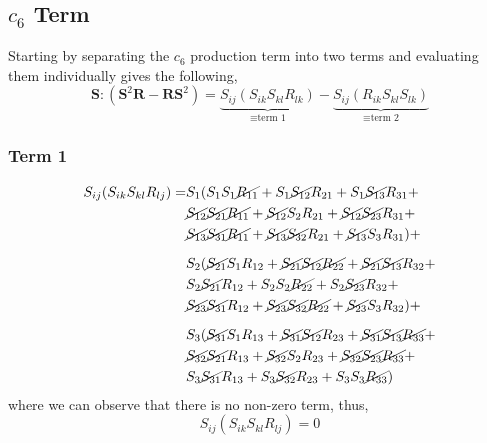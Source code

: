 \subsection{$c_{6}$ Term}
Starting by separating the $c_{6}$ production term into two terms
and evaluating them individually gives the following,
\begin{equation}
    \mathbf{S}:(\mathbf{S}^2\mathbf{R} - \mathbf{RS}^2) =
        \underbrace{S_{ij}(S_{ik}S_{kl}R_{lk})}_{\equiv \text{term 1}}
        -\underbrace{S_{ij}(R_{ik}S_{kl}S_{lk})}_{\equiv \text{term 2}}
\end{equation}
\subsubsection{Term 1}
\begin{equation}
    \begin{split}
        S_{ij}(S_{ik}S_{kl}R_{lj}) = & 
            S_{1}(
            S_{1}S_{1}\cancel{R_{11}} + S_{1}\cancel{S_{12}}R_{21} + S_{1}\cancel{S_{13}}R_{31} +   \\
        &   \cancel{S_{12}}\cancel{S_{21}}\cancel{R_{11}} + \cancel{S_{12}}S_{2}R_{21} + \cancel{S_{12}}\cancel{S_{23}}R_{31} +   \\
        &   \cancel{S_{13}}\cancel{S_{31}}\cancel{R_{11}} + \cancel{S_{13}}\cancel{S_{32}}R_{21} + \cancel{S_{13}}S_{3}R_{31} 
            ) +   \\[6pt]
        &   S_{2}(
            \cancel{S_{21}}S_{1}R_{12} + \cancel{S_{21}}\cancel{S_{12}}\cancel{R_{22}} + \cancel{S_{21}}\cancel{S_{13}}R_{32} +   \\
        &   S_{2}\cancel{S_{21}}R_{12} + S_{2}S_{2}\cancel{R_{22}} + S_{2}\cancel{S_{23}}R_{32} +   \\
        &   \cancel{S_{23}}\cancel{S_{31}}R_{12} + \cancel{S_{23}}\cancel{S_{32}}\cancel{R_{22}} + \cancel{S_{23}}S_{3}R_{32} 
            ) +   \\[6pt]
        &   S_{3}(
            \cancel{S_{31}}S_{1}R_{13} + \cancel{S_{31}}\cancel{S_{12}}R_{23} + \cancel{S_{31}}\cancel{S_{13}}\cancel{R_{33}} +   \\
        &   \cancel{S_{32}}\cancel{S_{21}}R_{13} + \cancel{S_{32}}S_{2}R_{23} + \cancel{S_{32}}\cancel{S_{23}}\cancel{R_{33}} +   \\
        &   S_{3}\cancel{S_{31}}R_{13} + S_{3}\cancel{S_{32}}R_{23} + S_{3}S_{3}\cancel{R_{33}} )
    \end{split}
\end{equation}
where we can observe that there is no non-zero term, thus,
\begin{equation}
        S_{ij}(S_{ik}S_{kl}R_{lj}) = 0
\end{equation}
\newpage
